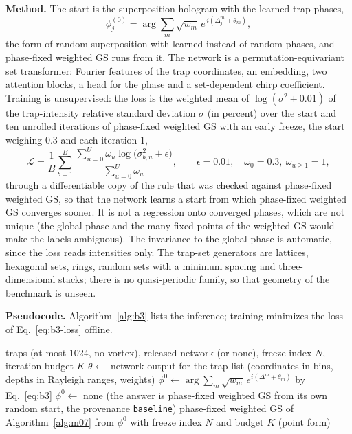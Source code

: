\textbf{Method.} The start is the superposition hologram with the learned trap phases,
\begin{equation}
\phi_j^{(0)}=\arg\sum_m\sqrt{w_m}\,e^{\,i(\Delta_j^m+\theta_m)},
\label{eq:b3}
\end{equation}
the form of random superposition with learned instead of random phases, and phase-fixed weighted GS runs from it. The network is a permutation-equivariant set transformer: Fourier features of the trap coordinates, an embedding, two attention blocks, a head for the phase and a set-dependent chirp coefficient. Training is unsupervised: the loss is the weighted mean of $\log(\sigma^2+0.01)$ of the trap-intensity relative standard deviation $\sigma$ (in percent) over the start and ten unrolled iterations of phase-fixed weighted GS with an early freeze, the start weighing 0.3 and each iteration 1,
\begin{equation}
\mathcal L=\frac1B\sum_{b=1}^{B}\frac{\sum_{u=0}^{U}\omega_u\log\big(\sigma_{b,u}^2+\epsilon\big)}{\sum_{u=0}^{U}\omega_u},\qquad \epsilon=0.01,\quad \omega_0=0.3,\ \omega_{u\ge1}=1,
\label{eq:b3-loss}
\end{equation}
through a differentiable copy of the rule that was checked against phase-fixed weighted GS, so that the network learns a start from which phase-fixed weighted GS converges sooner. It is not a regression onto converged phases, which are not unique (the global phase and the many fixed points of the weighted GS would make the labels ambiguous). The invariance to the global phase is automatic, since the loss reads intensities only. The trap-set generators are lattices, hexagonal sets, rings, random sets with a minimum spacing and three-dimensional stacks; there is no quasi-periodic family, so that geometry of the benchmark is unseen.

\textbf{Pseudocode.} Algorithm~\ref{alg:b3} lists the inference; training minimizes the loss of Eq.~\eqref{eq:b3-loss} offline.

\begin{algorithm}[t]
\caption{Learned warm start for phase-fixed weighted GS: the network predicts one start phase per trap, and phase-fixed weighted GS runs from the superposition hologram built with them.}
\label{alg:b3}
\begin{algorithmic}[1]
\Require traps (at most 1024, no vortex), released network (or none), freeze index $N$, iteration budget $K$
 \State $\theta\gets$ network output for the trap list (coordinates in bins, depths in Rayleigh ranges, weights)
  \State $\phi^0\gets\arg\sum_m\sqrt{w_m}\,e^{i(\Delta^m+\theta_m)}$ by Eq.~\eqref{eq:b3}
\Else \State $\phi^0\gets$ none (the answer is phase-fixed weighted GS from its own random start, the provenance \texttt{baseline}) \EndIf
\State \Return phase-fixed weighted GS of Algorithm~\ref{alg:m07} from $\phi^0$ with freeze index $N$ and budget $K$ (point form)
\end{algorithmic}
\end{algorithm}

